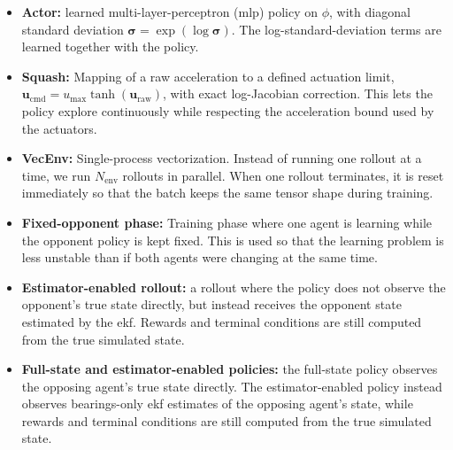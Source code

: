 \begin{itemize}
  \item \textbf{Actor:} learned multi-layer-perceptron (\acs{mlp}) policy on \(\phi\), with diagonal standard deviation \(\boldsymbol{\sigma}=\exp(\log\boldsymbol{\sigma})\).  The log-standard-deviation terms are learned together with the policy.
\item \textbf{Squash:} Mapping of a raw  acceleration to a defined actuation limit, \(\mathbf{u}_{\mathrm{cmd}} = u_{\max}\tanh(\mathbf{u}_{\mathrm{raw}})\), with exact log-Jacobian correction. This lets the policy explore continuously while respecting the acceleration bound used by the actuators.
\item \textbf{VecEnv:} Single-process vectorization. Instead of running one rollout at a time, we run \(N_{\mathrm{env}}\) rollouts in parallel. When one rollout terminates, it is reset immediately so that the batch keeps the same tensor shape during training.

\item \textbf{Fixed-opponent phase:} Training phase where one agent is learning while the opponent policy is kept fixed. This is used so that the learning problem is less unstable than if both agents were changing at the same time.

  \item \textbf{Estimator-enabled rollout:} a rollout where the policy does not observe the opponent's true state directly, but instead receives the opponent state estimated by the \acs{ekf}. Rewards and terminal conditions are still computed from the true simulated state.

  \item \textbf{Full-state and estimator-enabled policies:} the full-state policy observes the opposing agent's true state directly. The estimator-enabled policy instead observes bearings-only \acs{ekf} estimates of the opposing agent's state, while rewards and terminal conditions are still computed from the true simulated state.
\end{itemize}
